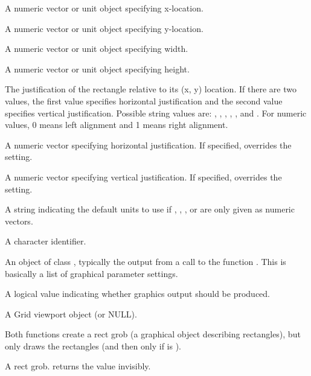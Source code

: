 %
\begin{Arguments}
\begin{ldescription}
\item[\code{x}] A numeric vector or unit object specifying x-location.
\item[\code{y}] A numeric vector or unit object specifying y-location.
\item[\code{width}] A numeric vector or unit object specifying width.
\item[\code{height}] A numeric vector or unit object specifying height.
\item[\code{just}] The justification of the rectangle 
relative to its (x, y) location.  If there are two values, the first
value specifies horizontal justification and the second value specifies
vertical justification.  Possible string values are: ,
, , , ,
and .  For numeric values, 0 means left alignment
and 1 means right alignment.

\item[\code{hjust}] A numeric vector specifying horizontal justification.
If specified, overrides the  setting.
\item[\code{vjust}] A numeric vector specifying vertical justification.
If specified, overrides the  setting.
\item[\code{default.units}] A string indicating the default units to use
if , , , or 
are only given as numeric vectors. 
\item[\code{name}]  A character identifier. 
\item[\code{gp}] An object of class , typically the output
from a call to the function .  This is basically
a list of graphical parameter settings.
\item[\code{draw}] A logical value indicating whether graphics output
should be produced.
\item[\code{vp}] A Grid viewport object (or NULL).
\end{ldescription}
\end{Arguments}
%
\begin{Details}\relax
Both functions create a rect grob (a graphical object describing
rectangles), but only 
draws the rectangles (and then only if  is ).

\end{Details}
%
\begin{Value}
A rect grob.   returns the value invisibly.
\end{Value}
